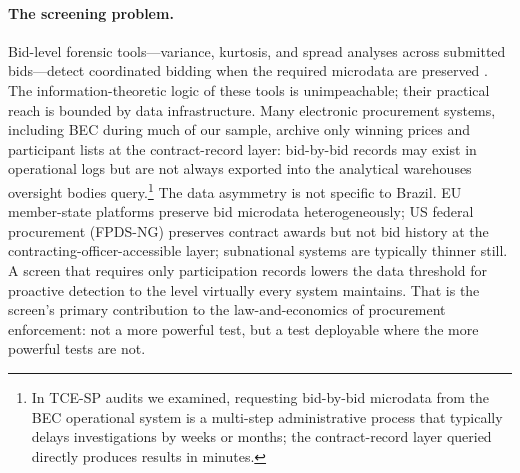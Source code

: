 \paragraph{The screening problem.}
Bid-level forensic tools---variance, kurtosis, and spread
analyses across submitted bids---detect coordinated bidding
when the required microdata are preserved
\citep{imhof2019detecting, huber2019machine,
wallimann2023machine}. The information-theoretic logic of these
tools is unimpeachable; their practical reach is bounded by
data infrastructure. Many electronic procurement systems,
including BEC during much of our sample, archive only winning
prices and participant lists at the contract-record layer:
bid-by-bid records may exist in operational logs but are not
always exported into the analytical warehouses oversight bodies
query.\footnote{In TCE-SP audits we examined, requesting
bid-by-bid microdata from the BEC operational system is a
multi-step administrative process that typically delays
investigations by weeks or months; the contract-record layer
queried directly produces results in minutes.} The data
asymmetry is not specific to Brazil. EU member-state platforms
preserve bid microdata heterogeneously; US federal procurement
(FPDS-NG) preserves contract awards but not bid history at the
contracting-officer-accessible layer; subnational systems are
typically thinner still. A screen that requires only
participation records lowers the data threshold for proactive
detection to the level virtually every system maintains. That
is the screen's primary contribution to the law-and-economics
of procurement enforcement: not a more powerful test, but a
test deployable where the more powerful tests are not.
